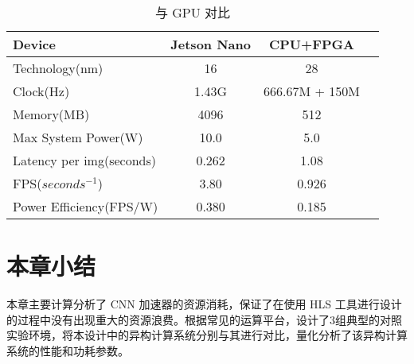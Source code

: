 \begin{table}[!htbp]
\caption{与 GPU 对比}
\label{tab:CompareGPU}
\centering
\footnotesize%
\setlength{\tabcolsep}{4pt}%
\renewcommand{\arraystretch}{1.2}%
\begin{tabular}{lccc}
\toprule
Device & Jetson Nano & CPU+FPGA \\
\midrule
Technology(nm)          & 16    & 28    \\
Clock(Hz)               & 1.43G & 666.67M + 150M \\
Memory(MB)              & 4096  & 512   \\
Max System Power(W)    & 10.0   & 5.0 \\
Latency per img(seconds)& 0.262 & 1.08 \\
FPS($seconds^{-1}$)     & 3.80 & 0.926 \\
Power Efficiency(FPS/W) & 0.380 & 0.185 \\
\bottomrule
\end{tabular}
\end{table}

\section{本章小结}

本章主要计算分析了 CNN 加速器的资源消耗，保证了在使用 HLS 工具进行设计的过程中没有出现重大的资源浪费。根据常见的运算平台，设计了3组典型的对照实验环境，将本设计中的异构计算系统分别与其进行对比，量化分析了该异构计算系统的性能和功耗参数。
